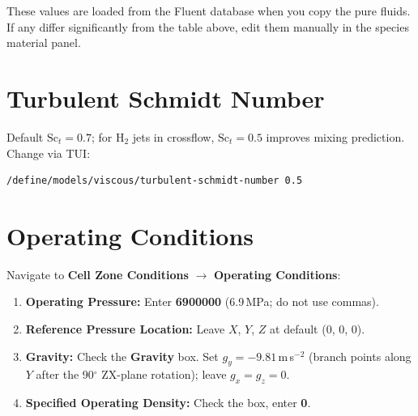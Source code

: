 \documentclass[12pt,a4paper]{report}
\begin{document}
\noindent These values are loaded from the Fluent database when you
copy the pure fluids.  If any differ significantly from the table above,
edit them manually in the species material panel.

\section{Turbulent Schmidt Number}
\label{sec:sct}

Default $\mathrm{Sc}_t = 0.7$; for H$_2$ jets in crossflow,
$\mathrm{Sc}_t = 0.5$ improves mixing prediction.  Change via TUI:

\begin{lstlisting}[language={},numbers=none]
/define/models/viscous/turbulent-schmidt-number 0.5
\end{lstlisting}

\section{Operating Conditions}

Navigate to \textbf{Cell Zone Conditions} $\rightarrow$
\textbf{Operating Conditions}:

\begin{enumerate}
  \item \textbf{Operating Pressure:} Enter \textbf{6900000}
        (6.9\,MPa; do not use commas).
  \item \textbf{Reference Pressure Location:} Leave $X$, $Y$, $Z$ at
        default (0, 0, 0).
  \item \textbf{Gravity:} Check the \textbf{Gravity} box.  Set
        $g_y = -9.81$\,m\,s$^{-2}$ (branch points along $Y$ after
        the 90$^\circ$ ZX-plane rotation); leave $g_x = g_z = 0$.
  \item \textbf{Specified Operating Density:} Check the box, enter
        \textbf{0}.
\end{enumerate}

\medskip
\noindent{}

\medskip
\noindent{}
\end{document}
